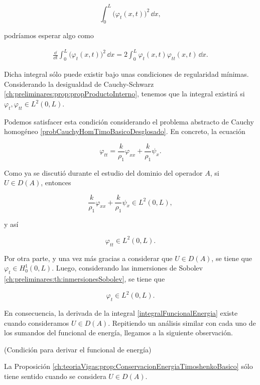 \[\int_0^L \big(\varphi_t(x,t)\big)^2 \, \dd x,\]

podríamos esperar algo como

\begin{align}
\label{integralFuncionalEnergia}
\frac{\dd}{\dd t}\int_0^L \big(\varphi_t(x,t)\big)^2 \, \dd x = 2\int_0^L \varphi_t(x,t) \varphi_{tt}(x,t) \, \dd x.
\end{align}

Dicha integral sólo puede existir bajo unas condiciones de regularidad mínimas. Considerando la desigualdad de Cauchy-Schwarz \ref{ch:preliminares:prop:propProductoInterno}, tenemos que la integral existirá si $\varphi_t,\varphi_{tt} \in L^2(0,L)$. 

Podemos satisfacer esta condición considerando el problema abstracto de Cauchy homogéneo \eqref{probCauchyHomTimoBasicoDesglosado}. En concreto, la ecuación

\[\varphi_{tt} = \frac{k}{\rho_1}\varphi_{xx} + \frac{k}{\rho_1}\psi_x.\]

Como ya se discutió durante el estudio del dominio del operador $A$, si $U \in D(A)$, entonces

\[\frac{k}{\rho_1}\varphi_{xx} + \frac{k}{\rho_1}\psi_x \in L^2(0,L),\]

y así

\[\varphi_{tt} \in L^2(0,L).\]

Por otra parte, y una vez más gracias a considerar que $U \in D(A)$, se tiene que $\varphi_t \in H_0^1(0,L)$. Luego, considerando las inmersiones de Sobolev \ref{ch:preliminares:th:inmersionesSobolev}, se tiene que 

\[\varphi_t \in L^2(0,L).\]

En consecuencia, la derivada de la integral \eqref{integralFuncionalEnergia} existe cuando consideramos $U \in D(A)$. Repitiendo un análisis similar con cada uno de los sumandos del funcional de energía, llegamos a la siguiente observación.\\

\begin{Observacion}{(Condición para derivar el funcional de energía)}
    \label{ch:teoriaVigas:obs:CondicionDerivadaFuncEnergia}
    
    La Proposición \eqref{ch:teoriaVigas:prop:ConservacionEnergiaTimoshenkoBasico} sólo tiene sentido cuando se considera $U \in D(A)$.
\end{Observacion}


